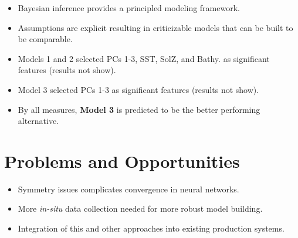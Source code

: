 \documentclass[a0,portrait]{a0poster}
\begin{document}
\begin{multicols}{2}
\begin{itemize}
    \item Bayesian inference provides a principled modeling framework.
    \item Assumptions are explicit resulting in criticizable models that can be built to be comparable.
    \item Models 1 and 2 selected PCs 1-3, SST, SolZ, and Bathy. as significant features (results not show).
    \item Model 3 selected PCs 1-3 as significant features (results not show).
    \item By all measures, \textbf{Model 3} is predicted to be the better performing alternative.
\end{itemize}

\color{DarkSlateGray} %

\section*{Problems and Opportunities}
\begin{itemize}
    \item Symmetry issues complicates convergence in neural networks.
    \item More \textit{in-situ} data collection needed for more robust model building.
    \item Integration of this and other approaches into existing production systems.
\end{itemize}


 



\end{multicols}
\end{document}
